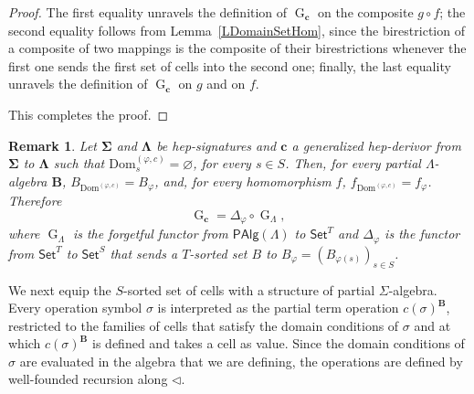 \documentclass[a4paper, reqno
]{amsart}
\DeclareMathOperator{\G}{G}
\newcommand{\sig}[1]{\mathbf{#1}}             %
\newcommand{\Dom}{\mathrm{Dom}}
\theoremstyle{plain}
\newtheorem{remark}[theorem]{Remark}
\theoremstyle{definition}
\begin{document}
\begin{proof}
The first equality unravels the definition of $\G_{\mathbf{c}}$ on the composite $g\circ f$; the second equality follows from Lemma~\ref{LDomainSetHom}, since the birestriction of a composite of two mappings is the composite of their birestrictions whenever the first one sends the first set of cells into the second one; finally, the last equality unravels the definition of $\G_{\mathbf{c}}$ on $g$ and on $f$.

This completes the proof.
\end{proof}

\begin{remark}\label{RDomainSetEmpty}
Let $\sig{\Sigma}$ and $\sig{\Lambda}$ be hep-signatures and $\mathbf{c}$ a generalized hep-derivor from $\sig{\Sigma}$ to $\sig{\Lambda}$ such that $\Dom^{(\varphi,c)}_{s}=\varnothing$, for every $s\in S$.
Then, for every partial $\Lambda$-algebra $\mathbf{B}$, $B_{\Dom^{(\varphi,c)}}=B_{\varphi}$, and, for every homomorphism $f$, $f_{\Dom^{(\varphi,c)}}=f_{\varphi}$.
Therefore
$$
\G_{\mathbf{c}}=\Delta_{\varphi}\circ\G_{\Lambda},
$$
where $\G_{\Lambda}$ is the forgetful functor from $\mathsf{PAlg}(\Lambda)$ to $\mathsf{Set}^{T}$ and $\Delta_{\varphi}$ is the functor from $\mathsf{Set}^{T}$ to $\mathsf{Set}^{S}$ that sends a $T$-sorted set $B$ to $B_{\varphi}=(B_{\varphi(s)})_{s\in S}$.
\end{remark}

We next equip the $S$-sorted set of cells with a structure of partial $\Sigma$-algebra.
Every operation symbol $\sigma$ is interpreted as the partial term operation $c(\sigma)^{\mathbf{B}}$, restricted to the families of cells that satisfy the domain conditions of $\sigma$ and at which $c(\sigma)^{\mathbf{B}}$ is defined and takes a cell as value.
Since the domain conditions of $\sigma$ are evaluated in the algebra that we are defining, the operations are defined by well-founded recursion along $\lhd$.
\end{document}
